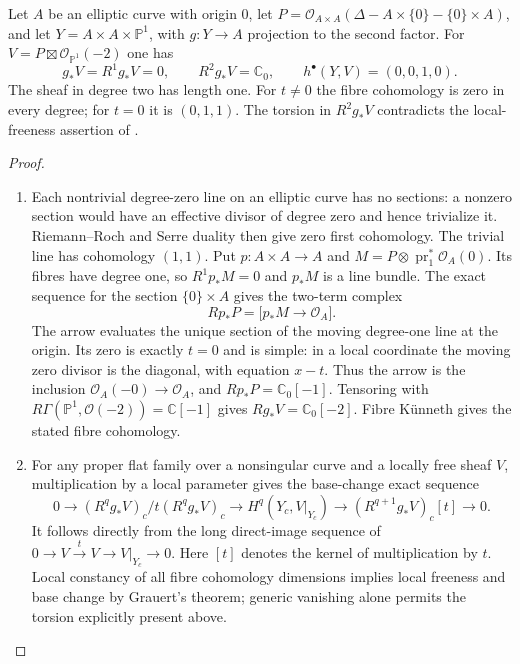 \begin{proposition}\hypertarget{tag-01GJ}{}\label{cdp:st:E12}

Let $A$ be an elliptic curve with origin $0$, let
$P=\mathcal O_{A\times A}(\Delta-A\times\{0\}-\{0\}\times A)$,
and let $Y=A\times A\times\mathbb P^1$, with $g:Y\to A$
projection to the second factor. For
$V=P\boxtimes\mathcal O_{\mathbb P^1}(-2)$ one has
\[
 g_*V=R^1g_*V=0,\qquad R^2g_*V=\mathbb C_0,
 \qquad h^\bullet(Y,V)=(0,0,1,0).
\]
The sheaf in degree two has length one. For $t\ne0$ the fibre
cohomology is zero in every degree; for $t=0$ it is $(0,1,1)$.
The torsion in $R^2g_*V$ contradicts the local-freeness assertion of
\citet[Lemma~1.5, pp.~79--80]{CDP98}.
\end{proposition}


\begin{proof}

\begin{enumerate}[label=\arabic*.,leftmargin=*]
\item Each nontrivial degree-zero line on an elliptic curve has no
sections: a nonzero section would have an effective divisor of
degree zero and hence trivialize it. Riemann--Roch and Serre
duality then give zero first cohomology. The trivial line has
cohomology $(1,1)$. Put $p:A\times A\to A$ and $M=P\otimes\operatorname{pr}_1^*
\mathcal O_A(0)$. Its fibres have degree one, so
$R^1p_*M=0$ and $p_*M$ is a line bundle. The exact sequence for
the section $\{0\}\times A$ gives the two-term complex
\[
 Rp_*P=\bigl[p_*M\longrightarrow\mathcal O_A\bigr].
\]
The arrow evaluates the unique section of the moving degree-one
line at the origin. Its zero is exactly $t=0$ and is simple:
in a local coordinate the moving zero divisor is the diagonal,
with equation $x-t$. Thus the arrow is the inclusion
$\mathcal O_A(-0)\to\mathcal O_A$, and
$Rp_*P=\mathbb C_0[-1]$. Tensoring with
$R\Gamma(\mathbb P^1,\mathcal O(-2))=\mathbb C[-1]$
gives $Rg_*V=\mathbb C_0[-2]$. Fibre K\"unneth gives
the stated fibre cohomology.

\item For any proper flat family over a nonsingular curve and a locally
free sheaf $V$, multiplication by a local parameter gives the
base-change exact sequence
\[
0\to (R^qg_*V)_c/t(R^qg_*V)_c
 \to H^q(Y_c,V|_{Y_c})
 \to (R^{q+1}g_*V)_c[t]\to0.
\]
It follows directly from the long direct-image sequence of
$0\to V\xrightarrow{t}V\to V|_{Y_c}\to0$. Here $[t]$ denotes
the kernel of multiplication by $t$. Local constancy of all
fibre cohomology dimensions implies local freeness and base
change by Grauert's theorem; generic vanishing alone permits
the torsion explicitly present above.

\end{enumerate}
\end{proof}